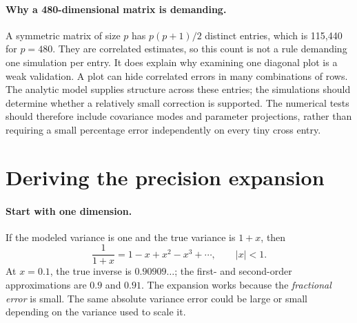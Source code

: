 \documentclass[11pt]{article}
\begin{document}
\paragraph{Why a 480-dimensional matrix is demanding.}
A symmetric matrix of size $p$ has $p(p+1)/2$ distinct entries, which is
115,440 for $p=480$. They are correlated estimates, so this count is not
a rule demanding one simulation per entry. It does explain why examining
one diagonal plot is a weak validation. A plot can hide correlated errors
in many combinations of rows. The analytic model supplies structure
across these entries; the simulations should determine whether a
relatively small correction is supported. The numerical tests should
therefore include covariance modes and parameter projections, rather
than requiring a small percentage error independently on every tiny
cross entry.

\section{Deriving the precision expansion}
\paragraph{Start with one dimension.}
If the modeled variance is one and the true variance is $1+x$, then
\begin{equation}
 \frac1{1+x}=1-x+x^2-x^3+\cdots,\qquad |x|<1.
\end{equation}
At $x=0.1$, the true inverse is $0.90909\ldots$; the first- and second-order
approximations are $0.9$ and $0.91$. The expansion works because the
\emph{fractional error} is small. The same absolute variance error could be
large or small depending on the variance used to scale it.
\end{document}
